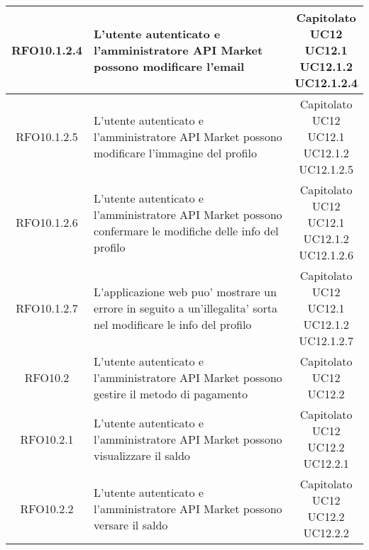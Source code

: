 \begin{longtable}{|c|p{8cm}|c|}
\hypertarget{RFO10.1.2.4}{RFO10.1.2.4} &  L'utente autenticato e l'amministratore API Market possono modificare l'email & \makecell*{Capitolato\\UC12\\UC12.1\\UC12.1.2\\UC12.1.2.4} \\
\hline

\hypertarget{RFO10.1.2.5}{RFO10.1.2.5} &  L'utente autenticato e l'amministratore API Market possono modificare l'immagine del profilo & \makecell*{Capitolato\\UC12\\UC12.1\\UC12.1.2\\UC12.1.2.5} \\
\hline

\hypertarget{RFO10.1.2.6}{RFO10.1.2.6} &  L'utente autenticato e l'amministratore API Market possono confermare le modifiche delle info del profilo & \makecell*{Capitolato\\UC12\\UC12.1\\UC12.1.2\\UC12.1.2.6} \\
\hline

\hypertarget{RFO10.1.2.7}{RFO10.1.2.7} &  L'applicazione web puo' mostrare un errore in seguito a un'illegalita' sorta nel modificare le info del profilo & \makecell*{Capitolato\\UC12\\UC12.1\\UC12.1.2\\UC12.1.2.7} \\
\hline

\hypertarget{RFO10.2}{RFO10.2} &  L'utente autenticato e l'amministratore API Market possono gestire il metodo di pagamento & \makecell*{Capitolato\\UC12\\UC12.2} \\
\hline

\hypertarget{RFO10.2.1}{RFO10.2.1} &  L'utente autenticato e l'amministratore API Market possono visualizzare il saldo & \makecell*{Capitolato\\UC12\\UC12.2\\UC12.2.1} \\
\hline

\hypertarget{RFO10.2.2}{RFO10.2.2} &  L'utente autenticato e l'amministratore API Market possono versare il saldo & \makecell*{Capitolato\\UC12\\UC12.2\\UC12.2.2} \\
\hline


\end{longtable}
